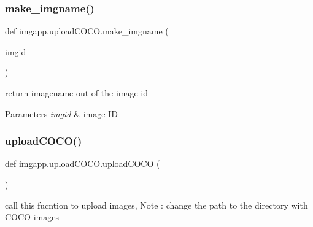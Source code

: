 \subsubsection{\texorpdfstring{make\+\_\+imgname()}{make\_imgname()}}
{\footnotesize\ttfamily def imgapp.\+upload\+C\+O\+C\+O.\+make\+\_\+imgname (\begin{DoxyParamCaption}\item[{}]{imgid }\end{DoxyParamCaption})}



return imagename out of the image id 


\begin{DoxyParams}{Parameters}
{\em imgid} & image ID \\
\hline
\end{DoxyParams}
\mbox{\label{namespaceimgapp_1_1uploadCOCO_a43518ccef3fb3c5b5afac1881a520292}} 
\subsubsection{\texorpdfstring{upload\+C\+O\+C\+O()}{uploadCOCO()}}
{\footnotesize\ttfamily def imgapp.\+upload\+C\+O\+C\+O.\+upload\+C\+O\+CO (\begin{DoxyParamCaption}{ }\end{DoxyParamCaption})}



call this fucntion to upload images, Note \+: change the path to the directory with C\+O\+CO images 

